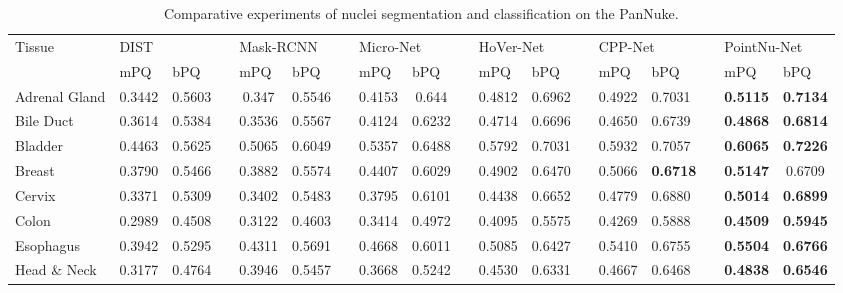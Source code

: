 \documentclass[lettersize,journal]{IEEEtran}
\begin{document}
\begin{table*}[ht]\small
\setlength\tabcolsep{4.5 pt}
\centering
\caption{Comparative experiments of nuclei segmentation and classification on the PanNuke.}
\begin{tabular}{lcccccccccccclllcc}
\toprule
\multirow{2}{*}{Tissue} & \multicolumn{2}{l}{DIST} & \multicolumn{1}{l}{} & \multicolumn{2}{l}{Mask-RCNN} & \multicolumn{1}{l}{} & \multicolumn{2}{l}{Micro-Net} & \multicolumn{1}{l}{} & \multicolumn{2}{l}{HoVer-Net} & \multicolumn{1}{l}{} & \multicolumn{2}{l}{ CPP-Net } &  & \multicolumn{2}{l}{PointNu-Net} \\ \cmidrule{2-3} \cmidrule{5-6} \cmidrule{8-9} \cmidrule{11-12} \cmidrule{14-15} \cmidrule{17-18} 
 & \multicolumn{1}{l}{mPQ} & \multicolumn{1}{l}{bPQ} & \multicolumn{1}{l}{} & \multicolumn{1}{l}{mPQ} & \multicolumn{1}{l}{bPQ} & \multicolumn{1}{l}{} & \multicolumn{1}{l}{mPQ} & \multicolumn{1}{l}{bPQ} & \multicolumn{1}{l}{} & \multicolumn{1}{l}{mPQ} & \multicolumn{1}{l}{bPQ} & \multicolumn{1}{l}{} & mPQ & bPQ &  & \multicolumn{1}{l}{mPQ} & \multicolumn{1}{l}{bPQ} \\ \midrule
Adrenal Gland & 0.3442 & 0.5603 &  & 0.347 & 0.5546 &  & 0.4153 & 0.644 &  & 0.4812 & 0.6962 &  & 0.4922 & 0.7031 &  & \textbf{0.5115} & \textbf{0.7134} \\
Bile Duct & 0.3614 & 0.5384 &  & 0.3536 & 0.5567 &  & 0.4124 & 0.6232 &  & 0.4714 & 0.6696 &  & 0.4650 & 0.6739 &  & \textbf{0.4868} & \textbf{0.6814} \\
Bladder & 0.4463 & 0.5625 &  & 0.5065 & 0.6049 &  & 0.5357 & 0.6488 &  & 0.5792 & 0.7031 &  & 0.5932 & 0.7057 &  & \textbf{0.6065} & \textbf{0.7226} \\
Breast & 0.3790 & 0.5466 &  & 0.3882 & 0.5574 &  & 0.4407 & 0.6029 &  & 0.4902 & 0.6470 &  & 0.5066 & \textbf{0.6718} &  & \textbf{0.5147} & 0.6709 \\
Cervix & 0.3371 & 0.5309 &  & 0.3402 & 0.5483 &  & 0.3795 & 0.6101 &  & 0.4438 & 0.6652 &  & 0.4779 & 0.6880 &  & \textbf{0.5014} & \textbf{0.6899} \\
Colon & 0.2989 & 0.4508 &  & 0.3122 & 0.4603 &  & 0.3414 & 0.4972 &  & 0.4095 & 0.5575 &  & 0.4269 & 0.5888 &  & \textbf{0.4509} & \textbf{0.5945} \\
Esophagus & 0.3942 & 0.5295 &  & 0.4311 & 0.5691 &  & 0.4668 & 0.6011 &  & 0.5085 & 0.6427 &  & 0.5410 & 0.6755 &  & \textbf{0.5504} & \textbf{0.6766} \\
Head \& Neck & 0.3177 & 0.4764 &  & 0.3946 & 0.5457 &  & 0.3668 & 0.5242 &  & 0.4530 & 0.6331 &  & 0.4667 & 0.6468 &  & \textbf{0.4838} & \textbf{0.6546} \\

\end{tabular}
\end{table*}
\end{document}
